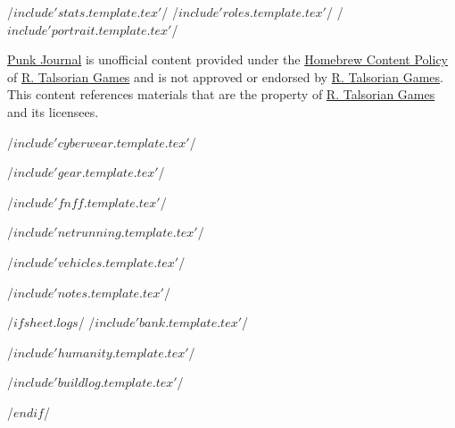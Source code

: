 \documentclass[landscape, 8pt]{article}
\begin{document}
\begin{multicols*}{3}[]

/$ include 'stats.template.tex'$/
\vfill\null
\columnbreak
/$ include 'roles.template.tex' $/
\vfill\null
\columnbreak
/$ include 'portrait.template.tex' $/

\vfill\null
\small
\noindent\href{https://rpgtools.info/cyberpunk/journal}{Punk Journal} is unofficial content provided under the
\href{https://rtalsoriangames.com/homebrew-content-policy/}{Homebrew Content Policy} of
\href{https://talsorianstore.com/}{R. Talsorian Games} and is not approved or
endorsed by \href{https://talsorianstore.com/}{R. Talsorian Games}. This content references materials
that are the property of \href{https://talsorianstore.com/}{R. Talsorian Games} and its licensees.
\normalsize
\renewcommand{\baselinestretch}{1}
\end{multicols*}

\begin{multicols*}{3}
/$ include 'cyberwear.template.tex'$/
\vfill\null
\columnbreak

/$ include 'gear.template.tex'$/
\vfill\null
\columnbreak
\end{multicols*}

/$ include 'fnff.template.tex'$/

/$ include 'netrunning.template.tex'$/

/$ include 'vehicles.template.tex'$/

/$ include 'notes.template.tex'$/

/$if sheet.logs $/
/$ include 'bank.template.tex'$/

\begin{multicols*}{2}

/$ include 'humanity.template.tex'$/
\vfill\null
\columnbreak

/$ include 'buildlog.template.tex'$/
\end{multicols*}
/$endif$/
\end{document}
